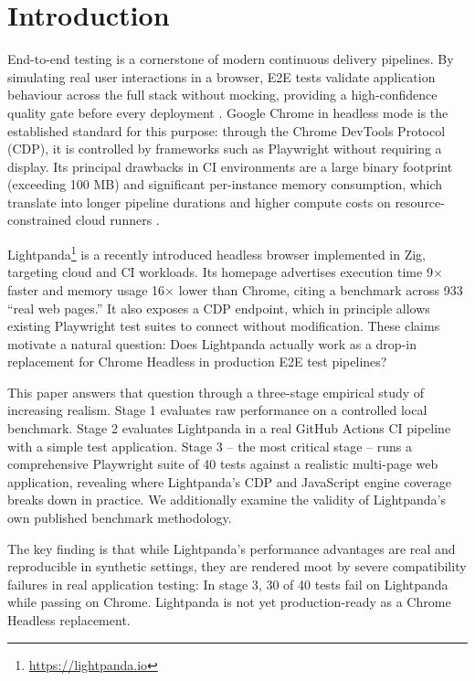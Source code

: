 \section{Introduction}

End-to-end testing is a cornerstone of modern continuous delivery pipelines. By simulating real user interactions in a browser, E2E tests validate application behaviour across the full stack without mocking, providing a high-confidence quality gate before every deployment \cite{humble2010continuousdelivery}. Google Chrome in headless mode is the established standard for this purpose: through the Chrome DevTools Protocol (CDP), it is controlled by frameworks such as Playwright \cite{playwright2024} without requiring a display. Its principal drawbacks in CI environments are a large binary footprint (exceeding 100 MB) and significant per-instance memory consumption, which translate into longer pipeline durations and higher compute costs on resource-constrained cloud runners \cite{laukkanen2017problems}.

Lightpanda\footnote{\url{https://lightpanda.io}} is a recently introduced headless browser implemented in Zig, targeting cloud and CI workloads. Its homepage advertises execution time 9$\times$ faster and memory usage 16$\times$ lower than Chrome, citing a benchmark across 933 ``real web pages.'' It also exposes a CDP endpoint, which in principle allows existing Playwright test suites to connect without modification. These claims motivate a natural question: Does Lightpanda actually work as a drop-in replacement for Chrome Headless in production E2E test pipelines?

This paper answers that question through a three-stage empirical study of increasing realism. Stage 1 evaluates raw performance on a controlled local benchmark. Stage 2 evaluates Lightpanda in a real GitHub Actions CI pipeline with a simple test application. Stage 3 -- the most critical stage -- runs a comprehensive Playwright suite of 40 tests against a realistic multi-page web application, revealing where Lightpanda's CDP and JavaScript engine coverage breaks down in practice. We additionally examine the validity of Lightpanda's own published benchmark methodology.

The key finding is that while Lightpanda's performance advantages are real and reproducible in synthetic settings, they are rendered moot by severe compatibility failures in real application testing: In stage 3, 30 of 40 tests fail on Lightpanda while passing on Chrome. Lightpanda is not yet production-ready as a Chrome Headless replacement.
